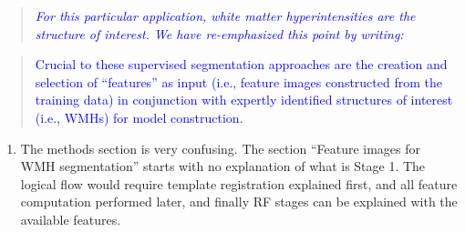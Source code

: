 \documentclass[12pt,]{article}
\providecommand{\tightlist}{%
  \setlength{\itemsep}{0pt}\setlength{\parskip}{0pt}}
\begin{document}
\begin{quote}
\emph{\textcolor{blue}{For this particular application, white matter hyperintensities
are the structure of interest.  We have re-emphasized this point by writing:
}}
\end{quote}

\begin{quote}
\textcolor{blue}{Crucial to these supervised segmentation approaches are the creation and selection of
``features'' as input (i.e., feature images constructed from the training data)
in conjunction with expertly identified structures of interest
(i.e., WMHs) for model construction.}
\end{quote}

\begin{enumerate}
\def\labelenumi{\arabic{enumi}.}
\setcounter{enumi}{5}
\tightlist
\item
  The methods section is very confusing. The section ``Feature images
  for WMH segmentation'' starts with no explanation of what is Stage 1.
  The logical flow would require template registration explained first,
  and all feature computation performed later, and finally RF stages can
  be explained with the available features.
\end{enumerate}
\end{document}

